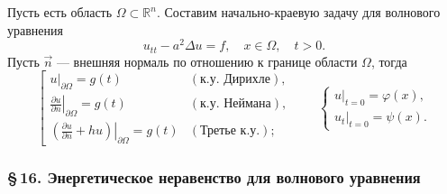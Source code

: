\documentclass[12pt,a5paper]{book}
\begin{document}
	Пусть есть область $\Omega \subset \mathbb{R}^n$. Составим начально-краевую задачу для волнового уравнения
	\begin{equation*}
		u_{tt} - a^2\Delta u = f, \quad x \in \Omega, \quad t > 0.
	\end{equation*}
	Пусть $\vec{n}$ --- внешняя нормаль по отношению к границе области $\Omega$, тогда
	\begin{equation*}
		\left[\begin{array}{ll}
			\left.u\right|_{\partial\Omega} = g(t) & (\text{к.у. Дирихле}), \\
			\left.\frac{\partial u}{\partial n}\right|_{\partial\Omega} = g(t) & (\text{к.у. Неймана}), \\
			\left.\left(\frac{\partial u}{\partial n} + hu\right)\right|_{\partial\Omega} = g(t) & (\text{Третье к.у.});
		\end{array}\right. \qquad \begin{cases}
			\left.u\right|_{t=0} = \varphi(x), \\
			\left.u_t\right|_{t=0} = \psi(x).
		\end{cases}
	\end{equation*}
	
	\subsubsection*{\S\,16. Энергетическое неравенство для волнового уравнения}
	
\end{document}
